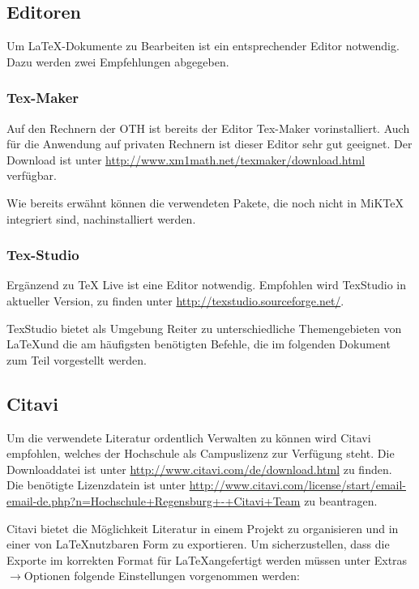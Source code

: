 		\subsection{Editoren}
		Um \LaTeX-Dokumente zu Bearbeiten ist ein entsprechender Editor notwendig. Dazu werden zwei Empfehlungen abgegeben.

		\subsubsection{Tex-Maker}
		Auf den Rechnern der OTH ist bereits der Editor Tex-Maker vorinstalliert. Auch für die Anwendung auf privaten Rechnern ist dieser Editor sehr gut geeignet. Der Download ist unter 		\url{http://www.xm1math.net/texmaker/download.html} verfügbar.

		Wie bereits erwähnt können die verwendeten Pakete, die noch nicht in MiKTeX integriert sind, nachinstalliert werden.
		\subsubsection{Tex-Studio}
        \label{ch:texstudio}
        Ergänzend zu TeX Live ist eine Editor notwendig. Empfohlen wird TexStudio in aktueller Version, zu finden unter \url{http://texstudio.sourceforge.net/}.

        TexStudio bietet als Umgebung Reiter zu unterschiedliche Themengebieten von \LaTeX und die am häufigsten benötigten Befehle, die im folgenden Dokument zum Teil vorgestellt werden.




		\subsection{Citavi}
		\label{ch:citavi}
		Um die verwendete Literatur ordentlich Verwalten zu können wird Citavi empfohlen, welches der Hochschule als Campuslizenz zur Verfügung steht.
		Die Downloaddatei ist unter \url{http://www.citavi.com/de/download.html} zu finden.\\
		Die benötigte Lizenzdatein ist unter \url{http://www.citavi.com/license/start/email-email-de.php?n=Hochschule+Regensburg+-+Citavi+Team} zu beantragen.

		Citavi bietet die Möglichkeit Literatur in einem Projekt zu organisieren und in einer von \LaTeX nutzbaren Form zu exportieren. Um sicherzustellen, dass die Exporte im korrekten Format für \LaTeX angefertigt werden müssen unter Extras$\rightarrow$Optionen folgende Einstellungen vorgenommen werden:

